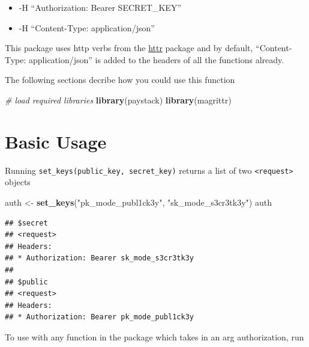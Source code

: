 \documentclass[]{book}
\newenvironment{Shaded}{\begin{snugshade}}{\end{snugshade}}
\newcommand{\KeywordTok}[1]{\textcolor[rgb]{0.13,0.29,0.53}{\textbf{#1}}}
\newcommand{\DataTypeTok}[1]{\textcolor[rgb]{0.13,0.29,0.53}{#1}}
\newcommand{\StringTok}[1]{\textcolor[rgb]{0.31,0.60,0.02}{#1}}
\newcommand{\CommentTok}[1]{\textcolor[rgb]{0.56,0.35,0.01}{\textit{#1}}}
\newcommand{\OperatorTok}[1]{\textcolor[rgb]{0.81,0.36,0.00}{\textbf{#1}}}
\newcommand{\NormalTok}[1]{#1}
\providecommand{\tightlist}{%
  \setlength{\itemsep}{0pt}\setlength{\parskip}{0pt}}
\begin{document}
\begin{itemize}
\tightlist
\item
  -H ``Authorization: Bearer SECRET\_KEY''
\item
  -H ``Content-Type: application/json''
\end{itemize}

This package uses http verbs from the
\href{https://httr.r-lib.org}{httr} package and by default,
``Content-Type: application/json'' is added to the headers of all the
functions already.

The following sections decribe how you could use this function

\begin{Shaded}
\begin{Highlighting}[]
\CommentTok{# load required libraries}
\KeywordTok{library}\NormalTok{(paystack)}
\KeywordTok{library}\NormalTok{(magrittr)}
\end{Highlighting}
\end{Shaded}

\section{Basic Usage}\label{basic-usage}

Running \texttt{set\_keys(public\_key,\ secret\_key)} returns a list of
two \texttt{\textless{}request\textgreater{}} objects

\begin{Shaded}
\begin{Highlighting}[]
\NormalTok{auth <-}\StringTok{ }\KeywordTok{set_keys}\NormalTok{(}\StringTok{"pk_mode_publ1ck3y"}\NormalTok{, }\StringTok{"sk_mode_s3cr3tk3y"}\NormalTok{)}
\NormalTok{auth}
\end{Highlighting}
\end{Shaded}

\begin{verbatim}
## $secret
## <request>
## Headers:
## * Authorization: Bearer sk_mode_s3cr3tk3y
## 
## $public
## <request>
## Headers:
## * Authorization: Bearer pk_mode_publ1ck3y
\end{verbatim}

To use with any function in the package which takes in an arg
authorization, run

\begin{Shaded}
\end{Shaded}
\end{document}

